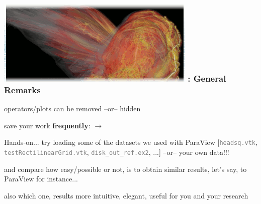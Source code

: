 














\begin{frame}
\frametitle{\href{https://wci.llnl.gov/simulation/computer-codes/visit/}{\includegraphics[height=.85cm]{figs/visit-logos/VisIt-03}} \hspace{-.85cm}{\bf \textcolor{lightgray}{VisIt}}: General Remarks}

\begin{beamerboxesrounded}[upper=block head,lower=block body,shadow=true]{}
        \textcolor{DarkBlue}{} operators/plots can be removed
                \framebox{\textcolor{DarkBlue}{\bf Delete}}
                --or--
                hidden \framebox{\textcolor{DarkBlue}{\bf Hide/Show}}

        \textcolor{DarkBlue}{} save your work {\bf frequently}:
                 $\rightarrow$ \framebox{\textcolor{DarkBlue}{\bf Save session...}}
\end{beamerboxesrounded}

\pause
\vspace{3mm}
\begin{beamerboxesrounded}[upper=block head,lower=block body,shadow=true]{Hands-on...}%
        \textcolor{DarkRed}{} try loading some of the datasets we used with ParaView [{\small \textcolor{gray}{\tt headsq.vtk}, \textcolor{gray}{\tt testRectilinearGrid.vtk}, \textcolor{gray}{\tt disk\_out\_ref.ex2}, ...}] --or-- your own data!!!

        \textcolor{DarkRed}{} and compare how easy/possible or not, is to obtain similar results, let's say, to ParaView for instance...

        \textcolor{DarkRed}{} also which one, results more intuitive, elegant, useful for you and your research
\end{beamerboxesrounded}
\end{frame}







